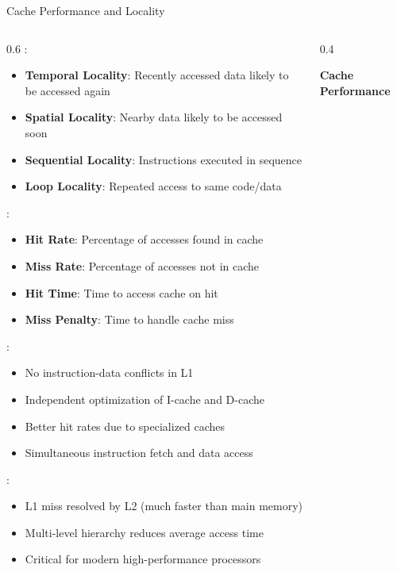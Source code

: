 \begin{frame}{Cache Performance and Locality}
\begin{columns}
\begin{column}{0.6\textwidth}
:
\begin{itemize}
\item \textbf{Temporal Locality}: Recently accessed data likely to be accessed again
\item \textbf{Spatial Locality}: Nearby data likely to be accessed soon
\item \textbf{Sequential Locality}: Instructions executed in sequence
\item \textbf{Loop Locality}: Repeated access to same code/data
\end{itemize}

\vspace{0.3cm}
:
\begin{itemize}
\item \textbf{Hit Rate}: Percentage of accesses found in cache
\item \textbf{Miss Rate}: Percentage of accesses not in cache
\item \textbf{Hit Time}: Time to access cache on hit
\item \textbf{Miss Penalty}: Time to handle cache miss
\end{itemize}

\vspace{0.3cm}
:
\begin{itemize}
\item No instruction-data conflicts in L1
\item Independent optimization of I-cache and D-cache
\item Better hit rates due to specialized caches
\item Simultaneous instruction fetch and data access
\end{itemize}

\vspace{0.3cm}
:
\begin{itemize}
\item L1 miss resolved by L2 (much faster than main memory)
\item Multi-level hierarchy reduces average access time
\item Critical for modern high-performance processors
\end{itemize}
\end{column}
\begin{column}{0.4\textwidth}
\begin{center}
\textbf{Cache Performance}
\vspace{0.3cm}


\end{center}
\end{column}
\end{columns}
\end{frame}
